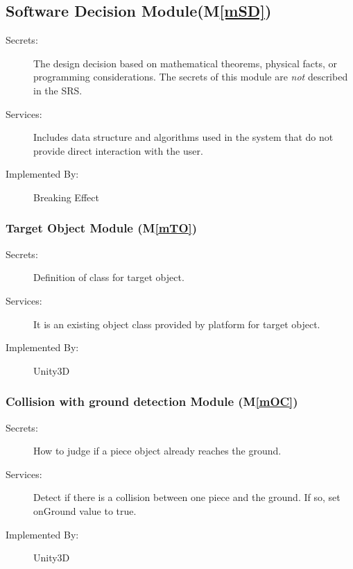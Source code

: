 \documentclass[12pt, titlepage]{article}
\newcommand{\mref}[1]{M\ref{#1}}
\begin{document}
	\subsection{Software Decision Module(\mref{mSD})}
	
	\begin{description}
		\item[Secrets:] The design decision based on mathematical theorems, physical
		facts, or programming considerations. The secrets of this module are
		\emph{not} described in the SRS.
		\item[Services:] Includes data structure and algorithms used in the system that
		do not provide direct interaction with the user. 
		\item[Implemented By:] Breaking Effect
	\end{description}
	
	\subsubsection{Target Object Module (\mref{mTO})}
	
	\begin{description}
		\item[Secrets:]Definition of class for target object.
		\item[Services:]It is an existing object class provided by platform for target object. 
		\item[Implemented By:] Unity3D
	\end{description}
	
	\subsubsection{Collision with ground detection Module (\mref{mOC})}
	
	\begin{description}
		\item[Secrets:] How to judge if a piece object already reaches the ground.
		\item[Services:] Detect if there is a collision between one piece and the ground. If so, set onGround value to true. 
		\item[Implemented By:] Unity3D
	\end{description}
	
\end{document}
